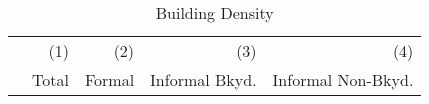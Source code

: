 \documentclass[12pt]{article}
\begin{document}







% 
% 





\begin{table}
\caption{Building Density}
\begin{tabular}{lDDDD}
\toprule
 & \small (1)  & \small (2) & \small (3) & \small (4) \\
 & Total & Formal   & Informal Bkyd. & Informal Non-Bkyd. \\ \midrule

\midrule
% 
\end{tabular}
\end{table}
\end{document}
